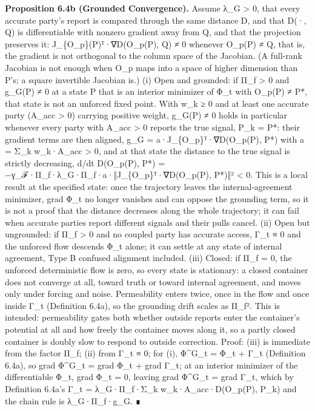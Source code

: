 \documentclass[
]{article}
\begin{document}
\textbf{Proposition 6.4b (Grounded Convergence).} Assume λ\_G
\textgreater{} 0, that every accurate party's report is compared through
the same distance D, and that D(·, Q) is differentiable with nonzero
gradient away from Q, and that the projection preserves it:
J\_\{O\_p\}(P)ᵀ·∇D(O\_p(P), Q) ≠ 0 whenever O\_p(P) ≠ Q, that is, the
gradient is not orthogonal to the column space of the Jacobian. (A
full-rank Jacobian is not enough when O\_p maps into a space of higher
dimension than P's; a square invertible Jacobian is.) (i) Open and
grounded: if Π\_f \textgreater{} 0 and g\_G(P) ≠ 0 at a state P that is
an interior minimizer of Φ\_t with O\_p(P) ≠ P*, that state is not an
unforced fixed point. With w\_k ≥ 0 and at least one accurate party
(A\_acc \textgreater{} 0) carrying positive weight, g\_G(P) ≠ 0 holds in
particular whenever every party with A\_acc \textgreater{} 0 reports the
true signal, P\_k = P*: their gradient terms are then aligned, g\_G =
a·J\_\{O\_p\}ᵀ·∇D(O\_p(P), P*) with a = Σ\_k w\_k·A\_acc \textgreater{}
0, and at that state the distance to the true signal is strictly
decreasing, d/dt D(O\_p(P), P*) =
−γ\_ℱ·Π\_f·λ\_G·Π\_f·a·‖J\_\{O\_p\}ᵀ·∇D(O\_p(P), P*)‖² \textless{} 0.
This is a local result at the specified state: once the trajectory
leaves the internal-agreement minimizer, grad Φ\_t no longer vanishes
and can oppose the grounding term, so it is not a proof that the
distance decreases along the whole trajectory; it can fail when accurate
parties report different signals and their pulls cancel. (ii) Open but
ungrounded: if Π\_f \textgreater{} 0 and no coupled party has accurate
access, Γ\_t ≡ 0 and the unforced flow descends Φ\_t alone; it can
settle at any state of internal agreement, Type B confused alignment
included. (iii) Closed: if Π\_f = 0, the unforced deterministic flow is
zero, so every state is stationary: a closed container does not converge
at all, toward truth or toward internal agreement, and moves only under
forcing and noise. Permeability enters twice, once in the flow and once
inside Γ\_t (Definition 6.4a), so the grounding drift scales as Π\_f².
This is intended: permeability gates both whether outside reports enter
the container's potential at all and how freely the container moves
along it, so a partly closed container is doubly slow to respond to
outside correction. Proof: (iii) is immediate from the factor Π\_f; (ii)
from Γ\_t ≡ 0; for (i), Φ\^{}G\_t = Φ\_t + Γ\_t (Definition 6.4a), so
grad Φ\^{}G\_t = grad Φ\_t + grad Γ\_t; at an interior minimizer of the
differentiable Φ\_t, grad Φ\_t = 0, leaving grad Φ\^{}G\_t = grad Γ\_t,
which by Definition 6.4a's Γ\_t = λ\_G·Π\_f·Σ\_k w\_k·A\_acc·D(O\_p(P),
P\_k) and the chain rule is λ\_G·Π\_f·g\_G. ∎
\end{document}
